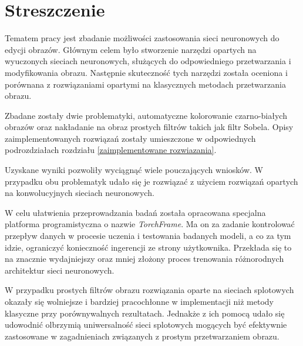 \section*{Streszczenie}

  Tematem pracy jest zbadanie możliwości zastosowania sieci neuronowych do
  edycji obrazów. Głównym celem było stworzenie narzędzi opartych na wyuczonych
  sieciach neuronowych, służących do odpowiedniego przetwarzania i
  modyfikowania obrazu. Następnie skuteczność tych narzędzi została oceniona i
  porównana z rozwiązaniami opartymi na klasycznych metodach przetwarzania obrazu.

  Zbadane zostały dwie problematyki, automatyczne kolorowanie czarno-białych obrazów
  oraz nakładanie na obraz prostych filtrów takich jak filtr Sobela. Opisy
  zaimplementowanych rozwiązań zostały umieszczone w odpowiednych podrozdziałach
  rozdziału \ref{zaimplementowane rozwiazania}.

  Uzyskane wyniki pozwoliły wyciągnąć wiele pouczających wniosków. W przypadku obu
  problematyk udało się je rozwiązać z użyciem rozwiązań opartych na konwolucyjnych
  sieciach neuronowych.

  W celu ułatwienia przeprowadzania badań została opracowana specjalna platforma
  programistyczna o nazwie \textit{TorchFrame}. Ma on za zadanie kontrolować
  przepływ danych w procesie uczenia i testowania badanych modeli, a co za tym
  idzie, ograniczyć konieczność ingerencji ze strony użytkownika. Przekłada
  się to na znacznie wydajniejszy oraz mniej złożony proces trenowania
  różnorodnych architektur sieci neuronowych.

  W przypadku prostych filtrów obrazu rozwiązania
  oparte na sieciach splotowych okazały się wolniejsze i bardziej pracochłonne w
  implementacji niż metody klasyczne przy porównywalnych rezultatach. Jednakże
  z ich pomocą udało się udowodnić olbrzymią uniwersalność sieci splotowych
  mogących być efektywnie zastosowane w zagadnieniach związanych z prostym
  przetwarzaniem obrazu.

